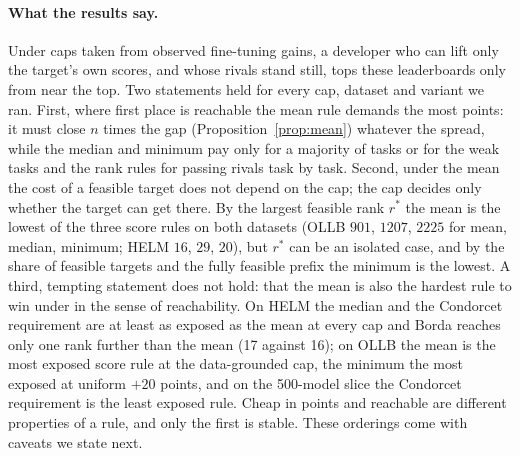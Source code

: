 \documentclass{article}
\begin{document}
\paragraph{What the results say.}
Under caps taken from observed fine-tuning gains, a developer who can lift only the target's own scores, and whose rivals stand still, tops these leaderboards only from near the top. Two statements held for every cap, dataset and variant we ran. First, where first place is reachable the mean rule demands the most points: it must close $n$ times the gap (Proposition~\ref{prop:mean}) whatever the spread, while the median and minimum pay only for a majority of tasks or for the weak tasks and the rank rules for passing rivals task by task. Second, under the mean the cost of a feasible target does not depend on the cap; the cap decides only whether the target can get there. By the largest feasible rank $r^*$ the mean is the lowest of the three score rules on both datasets (OLLB $901$, $1207$, $2225$ for mean, median, minimum; HELM $16$, $29$, $20$), but $r^*$ can be an isolated case, and by the share of feasible targets and the fully feasible prefix the minimum is the lowest. A third, tempting statement does not hold: that the mean is also the hardest rule to win under in the sense of reachability. On HELM the median and the Condorcet requirement are at least as exposed as the mean at every cap and Borda reaches only one rank further than the mean (17 against 16); on OLLB the mean is the most exposed score rule at the data-grounded cap, the minimum the most exposed at uniform $+20$ points, and on the 500-model slice the Condorcet requirement is the least exposed rule. Cheap in points and reachable are different properties of a rule, and only the first is stable. These orderings come with caveats we state next.
\end{document}
